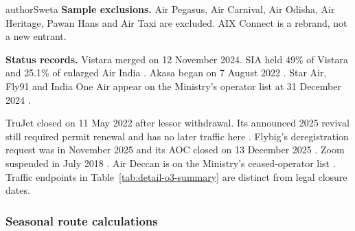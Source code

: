 \begin{mergedcontribution}{authorSweta}
\textbf{Sample exclusions.} Air Pegasus, Air Carnival, Air Odisha, Air Heritage, Pawan Hans and Air Taxi are excluded. AIX Connect is a rebrand, not a new entrant.

\textbf{Status records.} Vistara merged on 12 November 2024. SIA held 49\% of Vistara and 25.1\% of enlarged Air India \parencite{sia2025rule706a,tata2024vistaramerger}. Akasa began on 7 August 2022 \parencite{akasa2025anniversary}. Star Air, Fly91 and India One Air appear on the Ministry's operator list at 31 December 2024 \parencite[Section~1.7]{moca2025annual}.

TruJet closed on 11 May 2022 after lessor withdrawal. Its announced 2025 revival still required permit renewal and has no later traffic here \parencite{moca2026competition,seatrade2025trujet}. Flybig's deregistration request was in November 2025 and its AOC closed on 13 December 2025 \parencite{joshi2025flybig,moca2026competition}. Zoom suspended in July 2018 \parencite{businesstoday2019udan}. Air Deccan is on the Ministry's ceased-operator list \parencite{moca2024regional}. Traffic endpoints in Table~\ref{tab:detail-o3-summary} are distinct from legal closure dates.

\subsubsection{Seasonal route calculations}



\end{mergedcontribution}
